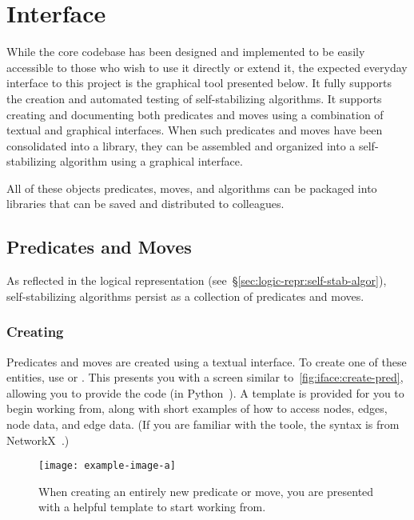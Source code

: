 \section{Interface}
\label{sec:interface-ssa}

While the core codebase has been designed and implemented
  to be easily accessible to those who wish to use it directly or extend it,
  the expected everyday interface to this project is
  the graphical tool presented below.
It fully supports the creation and automated testing of self-stabilizing algorithms.
It supports creating and documenting both predicates and moves
  using a combination of textual and graphical interfaces.
When such predicates and moves have been consolidated into a library,
  they can be assembled and organized into a self-stabilizing algorithm
  using a graphical interface.

All of these objects \Dash
  predicates, moves, and algorithms \Dash
  can be packaged into libraries that can be
  saved and distributed to colleagues.

\subsection{Predicates and Moves}
As reflected in the logical representation
  (see~\S\ref{sec:logic-repr:self-stab-algor}),
  self-stabilizing algorithms persist as a collection
  of predicates and moves.

\subsubsection{Creating}
Predicates and moves are created using a textual interface.
To create one of these entities,
  use 
   or .
This presents you with a screen similar to~\autoref{fig:iface:create-pred},
  allowing you to provide the code (in Python~\autocite{python3:ref}).
A template is provided for you to begin working from,
  along with short examples of how to access nodes, edges, node data, and edge data.
(If you are familiar with the toole,
  the syntax is from NetworkX~\autocite{hagberg:networkx}.)
\begin{figure}
  \centering
  \texttt{[image: example-image-a]}
  \caption{When creating an entirely new predicate or move,
    you are presented with a helpful template to start working from.}
  \label{fig:iface:create-pred}
\end{figure}

